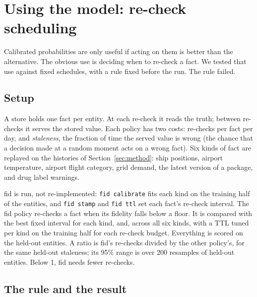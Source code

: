 
\section{Using the model: re-check scheduling}\label{sec:scheduling}

Calibrated probabilities are only useful if acting on them is better than
the alternative. The obvious use is deciding when to re-check a fact. We
tested that use against fixed schedules, with a rule fixed before the run.
The rule failed.

\subsection{Setup}

A store holds one fact per entity. At each re-check it reads the truth;
between re-checks it serves the stored value. Each policy has two costs:
re-checks per fact per day, and \emph{staleness}, the fraction of time the
served value is wrong (the chance that a decision made at a random moment
acts on a wrong fact). Six kinds of fact are replayed on the histories of
Section~\ref{sec:method}: ship positions, airport temperature, airport
flight category, grid demand, the latest version of a package, and drug
label warnings.

fid is run, not re-implemented: \texttt{fid calibrate} fits each kind on the
training half of the entities, and \texttt{fid stamp} and \texttt{fid ttl}
set each fact's re-check interval. The fid policy re-checks a fact when its
fidelity falls below a floor. It is compared with the best fixed interval
for each kind, and, across all six kinds, with a TTL tuned per kind on the
training half for each re-check budget. Everything is scored on the
held-out entities. A ratio is fid's re-checks divided by the other
policy's, for the same held-out staleness; its 95\% range is over 200
resamples of held-out entities. Below 1, fid needs fewer re-checks.

\subsection{The rule and the result}

